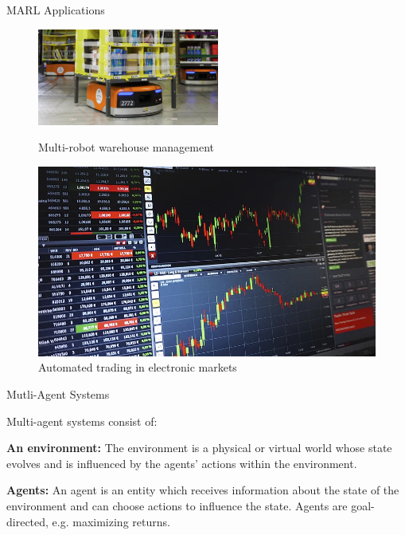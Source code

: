 \begin{frame}{MARL Applications}
\begin{figure}
    \begin{minipage}{.5\linewidth}
        \centering
        \includegraphics[width=.65\linewidth, keepaspectratio]{images/1_reware.png}
        \caption{Multi-robot warehouse management}
    \end{minipage}%
    \begin{minipage}{.5\linewidth}
        \centering
        \includegraphics[width=.65\linewidth, keepaspectratio]{images/1_trading.png}
        \caption{Automated trading in electronic markets}
    \end{minipage}
  \end{figure}
\end{frame}

\begin{frame}{Mutli-Agent Systems}

    Multi-agent systems consist of:
    \blist
        \item \textbf{An environment:} The environment is a physical or virtual world whose state evolves and is influenced by the agents' actions within the environment. 
        \item \textbf{Agents:} An agent is an entity which receives information about the state of the environment and can choose actions to influence the state. Agents are goal-directed, e.g. maximizing returns. 
    \elist
\end{frame}

